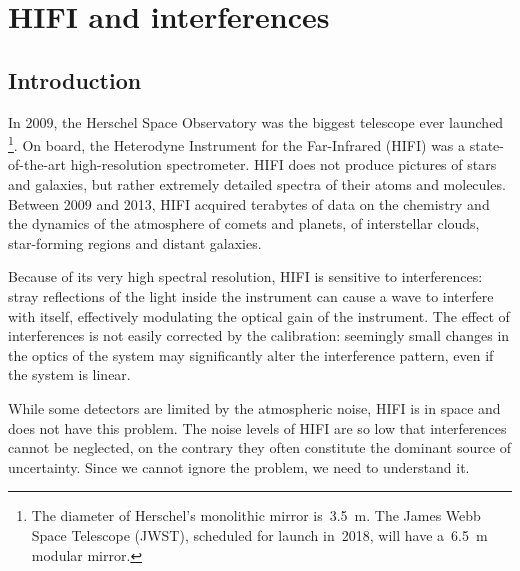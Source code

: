 \cleardoublepage
\chapter{HIFI and interferences}
\label{sec:chapter1}

\section{Introduction}
In 2009, the Herschel Space Observatory was the biggest telescope ever launched%
\footnote{
    The diameter of Herschel's monolithic mirror is~\SI{3.5}{\meter}.  The James Webb Space Telescope (JWST), scheduled for launch in~2018, will have a~\SI{6.5}{\meter} modular mirror.
}.
On board, the Heterodyne Instrument for the Far-Infrared (HIFI) was a state-of-the-art high-resolution spectrometer.
HIFI does not produce pictures of stars and galaxies, but rather extremely detailed spectra of their atoms and molecules.
Between 2009 and 2013, HIFI acquired terabytes of data on the chemistry and the dynamics of the atmosphere of comets and planets, of interstellar clouds, star-forming regions and distant galaxies.

Because of its very high spectral resolution, HIFI is sensitive to interferences:
stray reflections of the light inside the instrument can cause a wave to interfere with itself, effectively modulating the optical gain of the instrument.
The effect of interferences is not easily corrected by the calibration:
seemingly small changes in the optics of the system may significantly alter the interference pattern, even if the system is linear.

While some detectors are limited by the atmospheric noise, HIFI is in space and does not have this problem.
The noise levels of HIFI are so low that interferences cannot be neglected,
on the contrary they often constitute the dominant source of uncertainty.
Since we cannot ignore the problem, we need to understand it.


